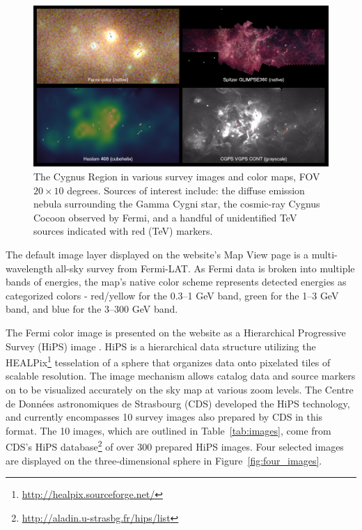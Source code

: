 \begin{figure}[tb]
  \centerline{\includegraphics[width=\textwidth]{figures/cygnus_region}}
  \caption{The Cygnus Region in various survey images and color maps, FOV $20 \times 10$ degrees. Sources of interest include: the diffuse emission nebula surrounding the Gamma Cygni star, the cosmic-ray Cygnus Cocoon observed by Fermi, and a handful of unidentified TeV sources indicated with red (TeV) markers.}
  \label{fig:cygnus}
\end{figure}
%

The default image layer displayed on the website's Map View page is a multi-wavelength all-sky survey from Fermi-LAT. As Fermi data is broken into multiple bands of energies, the map's native color scheme represents detected energies as categorized colors - red/yellow for the 0.3--1 GeV band, green for the 1--3 GeV band, and blue for the 3--300 GeV band.

 The Fermi color image is presented on the website as a Hierarchical Progressive Survey (HiPS) image \cite{hips}. HiPS is a hierarchical data structure utilizing the HEALPix\footnote[4]{\url{http://healpix.sourceforge.net/}} tesselation of a sphere that organizes data onto pixelated tiles of scalable resolution. The image mechanism allows catalog data and source markers on \gammasky to be visualized accurately on the sky map at various zoom levels. The Centre de Donn\'{e}es astronomiques de Strasbourg (CDS) developed the HiPS technology, and \gammasky currently encompasses 10 survey images also prepared by CDS in this format. The 10 images, which are outlined in Table~\ref{tab:images}, come from CDS's HiPS database\footnote[5]{\url{http://aladin.u-strasbg.fr/hips/list}} of over 300 prepared HiPS images. Four selected images are displayed on the three-dimensional sphere in Figure~\ref{fig:four_images}.

